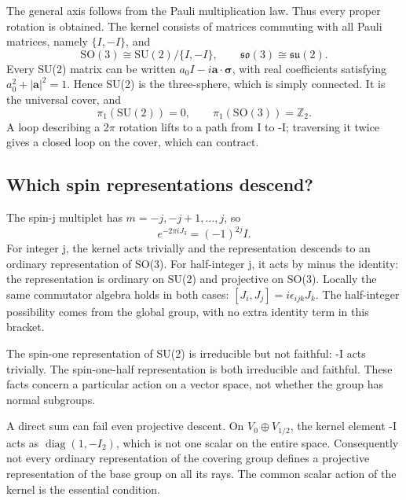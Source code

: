 \documentclass[11pt]{article}
\newcommand{\SO}{\mathrm{SO}}
\newcommand{\Z}{\mathbb Z}
\newcommand{\SU}{\mathrm{SU}}
\newcommand{\su}{\mathfrak{su}}
\newcommand{\so}{\mathfrak{so}}
\begin{document}
The general axis follows from the Pauli multiplication law. Thus every
proper rotation is obtained. The kernel consists of matrices commuting
with all Pauli matrices, namely \(\{I,-I\}\), and
\begin{equation}
 \boxed{\SO(3)\cong\SU(2)/\{I,-I\}},\qquad
 \so(3)\cong\su(2).
 \label{eq:double-cover}
\end{equation}
Every SU(2) matrix can be written \(a_0I-i\bm a\cdot\bm\sigma\), with
real coefficients satisfying \(a_0^2+|\bm a|^2=1\). Hence SU(2) is the
three-sphere, which is simply connected. It is the universal cover, and
\begin{equation}
 \pi_1(\SU(2))=0,\qquad \pi_1(\SO(3))=\Z_2.
 \label{eq:fundamental-groups}
\end{equation}
A loop describing a 2\(\pi\) rotation lifts to a path from I to -I;
traversing it twice gives a closed loop on the cover, which can contract.

\subsection{Which spin representations descend?}
The spin-j multiplet has \(m=-j,-j+1,\ldots,j\), so
\begin{equation}
 e^{-2\pi iJ_3}=(-1)^{2j}I.
 \label{eq:two-pi}
\end{equation}
For integer j, the kernel acts trivially and the representation descends
to an ordinary representation of SO(3). For half-integer j, it acts by
minus the identity: the representation is ordinary on SU(2) and
projective on SO(3). Locally the same commutator algebra holds in both
cases: \([J_i,J_j]=i\epsilon_{ijk}J_k\). The half-integer possibility
comes from the global group, with no extra identity term in this bracket.

The spin-one representation of SU(2) is irreducible but not faithful:
-I acts trivially. The spin-one-half representation is both irreducible
and faithful. These facts concern a particular action on a vector space,
not whether the group has normal subgroups.

A direct sum can fail even projective descent. On
\(V_0\oplus V_{1/2}\), the kernel element -I acts as
\(\operatorname{diag}(1,-I_2)\), which is not one scalar on the entire
space. Consequently not every ordinary representation of the covering
group defines a projective representation of the base group on all its
rays. The common scalar action of the kernel is the essential condition.
\end{document}

